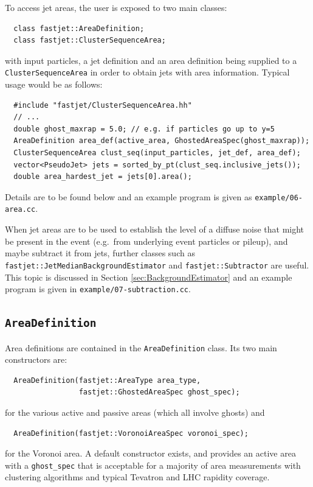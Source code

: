 \documentclass[12pt,a4]{article}
\newcommand{\ttt}[1]{{\small\texttt{#1}}}
\begin{document}
To access jet areas, the user is exposed to two main classes:
\begin{lstlisting}
  class fastjet::AreaDefinition;
  class fastjet::ClusterSequenceArea;
\end{lstlisting}
with input particles, a jet definition and an area definition being
supplied to a \ttt{ClusterSequenceArea} in order to obtain jets with
area information.
%
Typical usage would be as follows:
\begin{lstlisting}
  #include "fastjet/ClusterSequenceArea.hh"
  // ...
  double ghost_maxrap = 5.0; // e.g. if particles go up to y=5
  AreaDefinition area_def(active_area, GhostedAreaSpec(ghost_maxrap));
  ClusterSequenceArea clust_seq(input_particles, jet_def, area_def);
  vector<PseudoJet> jets = sorted_by_pt(clust_seq.inclusive_jets());
  double area_hardest_jet = jets[0].area();
\end{lstlisting}
Details are to be found below and an example program is given as
\ttt{example/06-area.cc}.


When jet areas are to be used to establish the level of a diffuse noise
that might be present in the event (e.g.\ from underlying event particles
or pileup), and maybe subtract it from jets, further classes such as
\ttt{fastjet::JetMedianBackgroundEstimator} and
\ttt{fastjet::Subtractor} are useful. This topic is discussed in
Section \ref{sec:BackgroundEstimator} and an example program is given
in \ttt{example/07-subtraction.cc}.



\subsection{\tt AreaDefinition}

Area definitions are contained in the \ttt{AreaDefinition}
class. Its two main constructors are:
\begin{lstlisting}
  AreaDefinition(fastjet::AreaType area_type, 
                 fastjet::GhostedAreaSpec ghost_spec);
\end{lstlisting}
for the various active and passive areas (which all involve ghosts)
and
\begin{lstlisting}
  AreaDefinition(fastjet::VoronoiAreaSpec voronoi_spec);
\end{lstlisting}
for the Voronoi area. A default constructor exists, and provides an
active area with a \ttt{ghost\_spec} that is acceptable for a majority
of area measurements with clustering algorithms and typical Tevatron
and LHC rapidity coverage.
\end{document}
